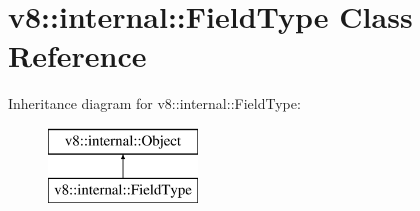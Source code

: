 \hypertarget{classv8_1_1internal_1_1_field_type}{}\section{v8\+:\+:internal\+:\+:Field\+Type Class Reference}
\label{classv8_1_1internal_1_1_field_type}
Inheritance diagram for v8\+:\+:internal\+:\+:Field\+Type\+:\begin{figure}[H]
\begin{center}
\leavevmode
\includegraphics[height=2.000000cm]{classv8_1_1internal_1_1_field_type}
\end{center}
\end{figure}
